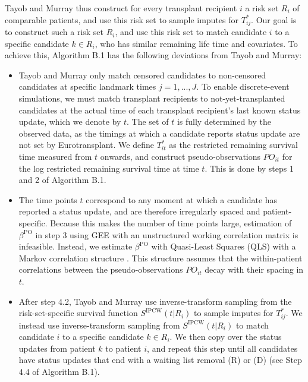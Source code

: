 \documentclass[11pt,twoside,]{book}
\begin{document}
Tayob and Murray thus construct for every transplant recipient \(i\) a risk set
\(R_i\) of comparable patients, and use this risk set to sample imputes
for \(T^*_{ij}\). Our goal is to construct such a risk set \(R_i\), and use this
risk set to match candidate \(i\) to a
specific candidate \(k \in R_i\), who has similar remaining life time and covariates.
To achieve this, Algorithm B.1 has the following deviations from Tayob and Murray:

\begin{itemize}
\item
  Tayob and Murray only match censored candidates to non-censored candidates
  at specific landmark times \(j = 1, ..., J\). To enable discrete-event
  simulations, we must match transplant recipients to not-yet-transplanted
  candidates at the actual time of each transplant recipient's last known
  status update, which we denote by \(t\). The set of \(t\) is fully
  determined by the observed data, as the timings at which a
  candidate reports status update are not set by Eurotransplant.
  We define \(T^*_{it}\) as the restricted
  remaining survival time measured from \(t\) onwards, and construct
  pseudo-observations \(PO_{it}\) for the log restricted remaining survival time
  at time \(t\). This is done by steps 1 and 2 of Algorithm B.1.
\item
  The time points \(t\) correspond to any moment at which a candidate has
  reported a status update, and are therefore irregularly spaced and
  patient-specific. Because this makes the number of time points large, estimation of
  \(\beta^{\text{PO}}\) in step 3 using GEE with an unstructured working
  correlation matrix is infeasible. Instead, we estimate
  \(\beta^\text{PO}\) with Quasi-Least Squares (QLS) with a Markov correlation structure
  \citep{xieqls2010}. This structure assumes that the within-patient correlations
  between the pseudo-observations \(PO_{it}\) decay with their spacing in \(t\).
\item
  After step 4.2, Tayob and Murray use inverse-transform sampling from the
  risk-set-specific survival function \(S^{\text{IPCW}}(t|R_i)\) to sample imputes for
  \(T^*_{ij}\). We instead use inverse-transform sampling from \(S^{\text{IPCW}}(t|R_i)\)
  to match candidate \(i\) to a specific candidate \(k \in R_i\). We then copy over
  the status updates from patient \(k\) to patient \(i\), and
  repeat this step until all candidates have status updates that end with a
  waiting list removal (R) or (D) (see Step 4.4 of Algorithm B.1).
\end{itemize}
\end{document}
